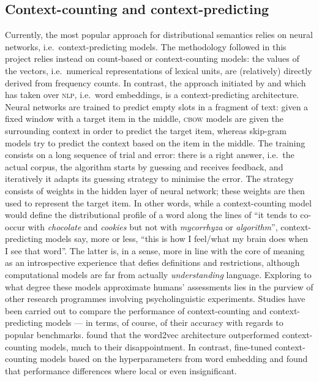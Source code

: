 \documentclass[
]{book}
\begin{document}
\hypertarget{context-counting-and-context-predicting}{%
\subsection{Context-counting and context-predicting}\label{context-counting-and-context-predicting}}

Currently, the most popular approach for distributional semantics relies on neural networks, i.e.~context-predicting models. The methodology followed in this project relies instead on count-based or context-counting models: the values of the vectors, i.e.~numerical representations of lexical units, are (relatively) directly derived from frequency counts. In contrast, the approach initiated by \textcite{mikolov.etal_2013} and which has taken over \textsc{nlp}, i.e.~word embeddings, is a context-predicting architecture. Neural networks are trained to predict empty slots in a fragment of text: given a fixed window with a target item in the middle, \textsc{cbow} models are given the surrounding context in order to predict the target item, whereas skip-gram models try to predict the context based on the item in the middle. The training consists on a long sequence of trial and error: there is a right answer, i.e.~the actual corpus, the algorithm starts by guessing and receives feedback, and iteratively it adapts its guessing strategy to minimise the error. The strategy consists of weights in the hidden layer of neural network; these weights are then used to represent the target item. In other words, while a context-counting model would define the distributional profile of a word along the lines of ``it tends to co-occur with \emph{chocolate} and \emph{cookies} but not with \emph{mycorrhyza} or \emph{algorithm}'', context-predicting models say, more or less, ``this is how I feel/what my brain does when I see that word''. The latter is, in a sense, more in line with the core of meaning as an introspective experience that defies definitions and restrictions, although computational models are far from actually \emph{understanding} language. Exploring to what degree these models approximate humans' assessments lies in the purview of other research programmes involving psycholinguistic experiments. Studies have been carried out to compare the performance of context-counting and context-predicting models --- in terms, of course, of their accuracy with regards to popular benchmarks. \textcite{baroni.etal_2014} found that the word2vec architecture outperformed context-counting models, much to their disappointment. In contrast, \textcite{levy.etal_2015} fine-tuned context-counting models based on the hyperparameters from word embedding and found that performance differences where local or even insignificant.
\end{document}
